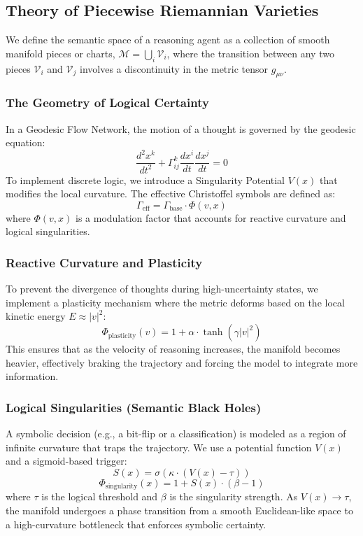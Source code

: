 \documentclass{article}
\numberwithin{equation}{section}
\begin{document}
\subsection{Theory of Piecewise Riemannian Varieties}
We define the semantic space of a reasoning agent as a collection of smooth manifold pieces or charts, $\mathcal{M} = \bigcup_i \mathcal{V}_i$, where the transition between any two pieces $\mathcal{V}_i$ and $\mathcal{V}_j$ involves a discontinuity in the metric tensor $g_{\mu\nu}$.

\subsubsection{The Geometry of Logical Certainty}
In a Geodesic Flow Network, the motion of a thought is governed by the geodesic equation:
\[
\frac{d^2 x^k}{dt^2} + \Gamma^k_{ij} \frac{dx^i}{dt} \frac{dx^j}{dt} = 0
\]
To implement discrete logic, we introduce a Singularity Potential $V(x)$ that modifies the local curvature. The effective Christoffel symbols are defined as:
\[
\Gamma_{\text{eff}} = \Gamma_{\text{base}} \cdot \Phi(v, x)
\]
where $\Phi(v, x)$ is a modulation factor that accounts for reactive curvature and logical singularities.

\subsubsection{Reactive Curvature and Plasticity}
To prevent the divergence of thoughts during high-uncertainty states, we implement a plasticity mechanism where the metric deforms based on the local kinetic energy $E \approx |v|^2$:
\[
\Phi_{\text{plasticity}}(v) = 1 + \alpha \cdot \tanh(\gamma |v|^2)
\]
This ensures that as the velocity of reasoning increases, the manifold becomes heavier, effectively braking the trajectory and forcing the model to integrate more information.

\subsubsection{Logical Singularities (Semantic Black Holes)}
A symbolic decision (e.g., a bit-flip or a classification) is modeled as a region of infinite curvature that traps the trajectory. We use a potential function $V(x)$ and a sigmoid-based trigger:
\[
S(x) = \sigma\left(\kappa \cdot (V(x) - \tau)\right)
\]
\[
\Phi_{\text{singularity}}(x) = 1 + S(x) \cdot (\beta - 1)
\]
where $\tau$ is the logical threshold and $\beta$ is the singularity strength. As $V(x) \to \tau$, the manifold undergoes a phase transition from a smooth Euclidean-like space to a high-curvature bottleneck that enforces symbolic certainty.
\end{document}
